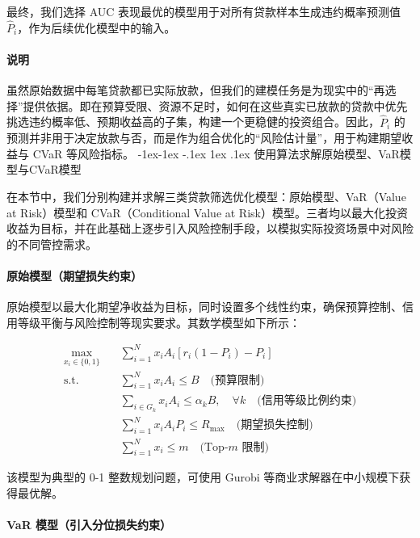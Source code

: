 \documentclass[nonblindrev]{write_paper}
\makeatletter
\renewcommand\subsection{\@startsection{subsection}{2}{\z@}%
                                     {-1ex\@plus -1ex \@minus -.1ex}%
                                     {1ex \@plus .1ex}%
                                     {\normalfont \normalsize \bfseries}}
\makeatother
\begin{document}
最终，我们选择 AUC 表现最优的模型用于对所有贷款样本生成违约概率预测值 $\hat{P}_i$，作为后续优化模型中的输入。

\paragraph{说明}
虽然原始数据中每笔贷款都已实际放款，但我们的建模任务是为现实中的“再选择”提供依据。即在预算受限、资源不足时，如何在这些真实已放款的贷款中优先挑选违约概率低、预期收益高的子集，构建一个更稳健的投资组合。因此，$\hat{P}_i$ 的预测并非用于决定放款与否，而是作为组合优化的“风险估计量”，用于构建期望收益与 CVaR 等风险指标。
\subsection{使用算法求解原始模型、VaR模型与CVaR模型}
\label{subsec:model_solving}

在本节中，我们分别构建并求解三类贷款筛选优化模型：原始模型、VaR（Value at Risk）模型和 CVaR（Conditional Value at Risk）模型。三者均以最大化投资收益为目标，并在此基础上逐步引入风险控制手段，以模拟实际投资场景中对风险的不同管控需求。

\vspace{1em}
\paragraph{原始模型（期望损失约束）}
原始模型以最大化期望净收益为目标，同时设置多个线性约束，确保预算控制、信用等级平衡与风险控制等现实要求。其数学模型如下所示：

\begin{align*}
\max_{x_i \in \{0,1\}} \quad & \sum_{i=1}^N x_i A_i \left[ r_i(1 - P_i) - P_i \right] \\
\text{s.t.} \quad
& \sum_{i=1}^N x_i A_i \le B \quad \text{(预算限制)} \\
& \sum_{i \in G_k} x_i A_i \le \alpha_k B, \quad \forall k \quad \text{(信用等级比例约束)} \\
& \sum_{i=1}^N x_i A_i P_i \le R_{\max} \quad \text{(期望损失控制)} \\
& \sum_{i=1}^N x_i \le m \quad \text{(Top-$m$ 限制)}
\end{align*}

该模型为典型的 0-1 整数规划问题，可使用 Gurobi 等商业求解器在中小规模下获得最优解。

\vspace{1em}
\paragraph{VaR 模型（引入分位损失约束）}
\end{document}
